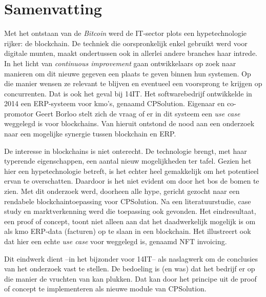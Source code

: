
%
%
%


\chapter*{Samenvatting}

Met het ontstaan van de \textit{Bitcoin} werd de IT-sector plots een hypetechnologie rijker: de blockchain. De techniek die oorspronkelijk enkel gebruikt werd voor digitale munten, maakt ondertussen ook in allerlei andere branches haar intrede. In het licht van \textit{continuous improvement} gaan ontwikkelaars op zoek naar manieren om dit nieuwe gegeven een plaats te geven binnen hun systemen. Op die manier wensen ze relevant te blijven en eventueel een voorsprong te krijgen op concurrenten. Dat is ook het geval bij 14IT. Het softwarebedrijf ontwikkelde in 2014 een ERP-systeem voor kmo's, genaamd CPSolution. Eigenaar en co-promotor Geert Borloo stelt zich de vraag of er in dit systeem een \textit{use case} weggelegd is voor blockchains. Van hieruit ontstond de nood aan een onderzoek naar een mogelijke synergie tussen blockchain en ERP.

De interesse in blockchains is niet onterecht. De technologie brengt, met haar typerende eigenschappen, een aantal nieuw mogelijkheden ter tafel. Gezien het hier een hypetechnologie betreft, is het echter heel gemakkelijk om het potentieel ervan te overschatten. Daardoor is het niet evident om door het bos de bomen te zien. Met dit onderzoek werd, doorheen alle hype, gericht gezocht naar een rendabele blockchaintoepassing voor CPSolution. Na een literatuurstudie, case study en marktverkenning werd die toepassing ook gevonden. Het eindresultaat, een proof of concept, toont niet alleen aan dat het daadwerkelijk mogelijk is om als kmo ERP-data (facturen) op te slaan in een blockchain. Het illustreert ook dat hier een echte \textit{use case} voor weggelegd is, genaamd NFT invoicing.

Dit eindwerk dient --in het bijzonder voor 14IT-- als naslagwerk om de conclusies van het onderzoek vast te stellen. De bedoeling is (en was) dat het bedrijf er op die manier de vruchten van kan plukken. Dat kan door het principe uit de proof of concept te implementeren als nieuwe module van CPSolution.

